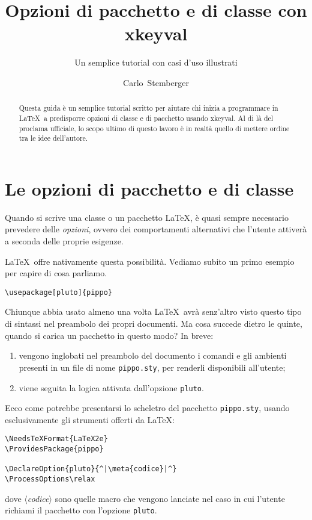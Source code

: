 \documentclass{scrartcl}
\newcommand{\meta}[1]{$\langle$\textit{#1}$\rangle$}
\begin{document}
\title{Opzioni di pacchetto e di classe con xkeyval}
\subtitle{Un semplice tutorial con casi d'uso illustrati}
\author{Carlo~Stemberger}
\publishers{ver.~0.0}
\maketitle

\begin{abstract}
\noindent Questa guida è un semplice tutorial scritto per aiutare chi inizia a programmare in \LaTeX\ a predisporre opzioni di classe e di pacchetto usando xkeyval. Al di là del proclama ufficiale, lo scopo ultimo di questo lavoro è in realtà quello di mettere ordine tra le idee dell'autore.
\end{abstract}

\section{Le opzioni di pacchetto e di classe}
Quando si scrive una classe o un pacchetto \LaTeX, è quasi sempre necessario prevedere delle \emph{opzioni}, ovvero dei comportamenti alternativi che l'utente attiverà a seconda delle proprie esigenze.

\LaTeX\ offre nativamente questa possibilità. Vediamo subito un primo esempio per capire di cosa parliamo.
\begin{lstlisting}
\usepackage[pluto]{pippo}
\end{lstlisting}
Chiunque abbia usato almeno una volta \LaTeX\ avrà senz'altro visto questo tipo di sintassi nel preambolo dei propri documenti. Ma cosa succede dietro le quinte, quando si carica un pacchetto in questo modo? In breve:
\begin{enumerate}
\item vengono inglobati nel preambolo del documento i comandi e gli ambienti presenti in un file di nome \lstinline+pippo.sty+, per renderli disponibili all'utente;
\item viene seguita la logica attivata dall'opzione \lstinline+pluto+.
\end{enumerate}
Ecco come potrebbe presentarsi lo scheletro del pacchetto \lstinline+pippo.sty+, usando esclusivamente gli strumenti offerti da \LaTeX:
\begin{lstlisting}
\NeedsTeXFormat{LaTeX2e}
\ProvidesPackage{pippo}

\DeclareOption{pluto}{^|\meta{codice}|^}
\ProcessOptions\relax
\end{lstlisting}
dove \meta{codice} sono quelle macro che vengono lanciate nel caso in cui l'utente richiami il pacchetto con l'opzione \lstinline+pluto+.
\end{document}
